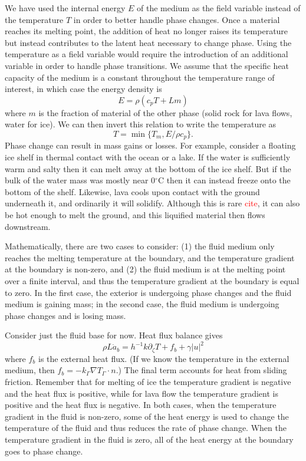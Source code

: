 \documentclass{article}
\theoremstyle{definition}
\theoremstyle{plain}
\begin{document}
We have used the internal energy $E$ of the medium as the field variable instead of the temperature $T$ in order to better handle phase changes.
Once a material reaches its melting point, the addition of heat no longer raises its temperature but instead contributes to the latent heat necessary to change phase.
Using the temperature as a field variable would require the introduction of an additional variable in order to handle phase transitions.
We assume that the specific heat capacity of the medium is a constant throughout the temperature range of interest, in which case the energy density is
\begin{equation}
    E = \rho(c_pT + Lm)
\end{equation}
where $m$ is the fraction of material of the other phase (solid rock for lava flows, water for ice).
We can then invert this relation to write the temperature as
\begin{equation}
    T = \min\{T_m, E/\rho c_p\}.
\end{equation}
Phase change can result in mass gains or losses.
For example, consider a floating ice shelf in thermal contact with the ocean or a lake.
If the water is sufficiently warm and salty then it can melt away at the bottom of the ice shelf.
But if the bulk of the water mass was mostly near 0${}^\circ$C then it can instead freeze onto the bottom of the shelf.
Likewise, lava cools upon contact with the ground underneath it, and ordinarily it will solidify.
Although this is rare \textcolor{red}{cite}, it can also be hot enough to melt the ground, and this liquified material then flows downstream.

Mathematically, there are two cases to consider: (1) the fluid medium only reaches the melting temperature at the boundary, and the temperature gradient at the boundary is non-zero, and (2) the fluid medium is at the melting point over a finite interval, and thus the temperature gradient at the boundary is equal to zero.
In the first case, the exterior is undergoing phase changes and the fluid medium is gaining mass; in the second case, the fluid medium is undergoing phase changes and is losing mass.

Consider just the fluid base for now.
Heat flux balance gives
\begin{equation}
    \rho L\dot a_b = h^{-1}k\partial_\zeta T + f_b + \gamma|u|^2
\end{equation}
where $f_b$ is the external heat flux.
(If we know the temperature in the external medium, then $f_b = -k_\Gamma\nabla T_\Gamma\cdot n$.)
The final term accounts for heat from sliding friction.
Remember that for melting of ice the temperature gradient is negative and the heat flux is positive, while for lava flow the temperature gradient is positive and the heat flux is negative.
In both cases, when the temperature gradient in the fluid is non-zero, some of the heat energy is used to change the temperature of the fluid and thus reduces the rate of phase change.
When the temperature gradient in the fluid is zero, all of the heat energy at the boundary goes to phase change.
\end{document}
